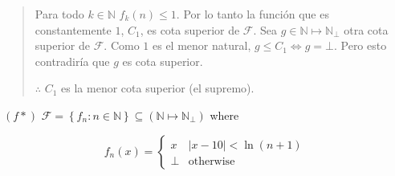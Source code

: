 \documentclass[article, 12pt]{article}
\begin{document}
\small
\begin{quote}

Para todo $k\in \mathbb{N}$ $f_k(n) \leq 1$. Por lo tanto la función que es
constantemente $1$, $C_1$, es cota superior de $\mathcal{F}$. Sea 
$g \in \mathbb{N} \mapsto \mathbb{N}_\bot$ otra cota superior de $\mathcal{F}$.
Como $1$ es el menor natural, $g \leq C_1 \iff g = \bot $. Pero esto
contradiría que $g$ es cota superior. 

$\therefore $ $C_1$ es la menor cota superior (el supremo).


\end{quote}
\normalsize


$(f*)$ $\mathcal{F} = \left\{ f_n : n \in \mathbb{N} \right\} \subseteq
\left( \mathbb{N} \mapsto \mathbb{N}_\bot  \right) $ where 

\begin{equation*}
  f_n(x) = \begin{cases}
    x & |x - 10| < \ln \left( n + 1 \right) \\ 
    \bot  & \text{otherwise}
  \end{cases}
\end{equation*}
\end{document}
